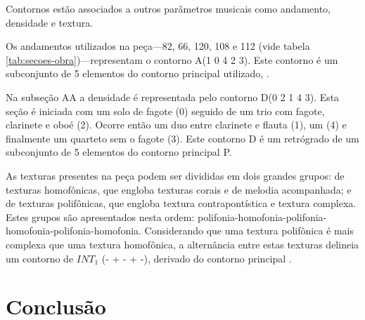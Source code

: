 Contornos estão associados a outros parâmetros musicais como
andamento, densidade e textura.

Os andamentos utilizados na peça---82, 66, 120, 108 e 112 (vide tabela
\ref{tab:secoes-obra})---representam o contorno A(1 0 4 2 3). Este
contorno é um subconjunto de 5 elementos do contorno principal
utilizado, \contpr{}.

Na subseção AA a densidade é representada pelo contorno D(0 2 1 4
3). Esta seção é iniciada com um solo de fagote (0) seguido de um trio
com fagote, clarinete e oboé (2). Ocorre então um duo entre clarinete
e flauta (1), um  (4) e finalmente um quarteto sem o fagote
(3). Este contorno D é um retrógrado de um subconjunto de 5 elementos
do contorno principal P.

As texturas presentes na peça podem ser divididas em dois grandes
grupos: de texturas homofônicas, que engloba texturas corais e de
melodia acompanhada; e de texturas polifônicas, que engloba textura
contrapontística e textura complexa. Estes grupos são apresentados
nesta ordem:
polifonia-homofonia-polifonia-homofonia-polifonia-homofonia. Considerando
que uma textura polifônica é mais complexa que uma textura homofônica,
a alternância entre estas texturas delineia um contorno de $INT_1$ (-
+ - + -), derivado do contorno principal \contpr{}.

\chapter{Conclusão}
\label{cha:conclusao}

